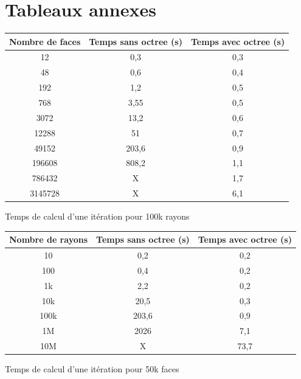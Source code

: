 \section{Tableaux annexes}

\begin{tableth}
	\begin{tabular}{| c | c | c |}
		\hline
		Nombre de faces & Temps \textbf{sans} \gls{octree} (s) & Temps \textbf{avec} \gls{octree} (s)\\
		  \hline
		  \hline
		   12 &0,3&	0,3 \\
		   \hline
		48 &0,6	&0,4 \\
		   \hline
		192 & 1,2	&0,5\\
		   \hline
		768 & 3,55&	0,5\\
		   \hline
		3072 & 13,2	&0,6\\
		   \hline
		12288 &51	&0,7 \\
		     \hline
		     49152 & 203,6	&0,9\\
		   \hline
		196608 & 808,2	&1,1\\
		\hline
		786432 & X & 1,7 \\
		\hline
		3145728 & X & 6,1 \\
		\hline
	 \end{tabular}
	\caption{Temps de calcul d'une itération pour 100k rayons}
	\label{tabComplexite1}
\end{tableth}

\begin{tableth}
	\begin{tabular}{| c | c | c |}
		\hline
		Nombre de rayons & Temps \textbf{sans} \gls{octree} (s)& Temps \textbf{avec} \gls{octree} (s)\\
		  \hline
		  \hline
		   10 &0,2&	0,2 \\
		   \hline
		100 &0,4	&0,2 \\
		   \hline
		1k & 2,2	&0,2\\
		   \hline
		10k & 20,5&	0,3\\
		   \hline
		100k & 203,6&	0,9\\
		   \hline
		1M &2026 &	7,1 \\
		\hline
		10M & X &	73,7 \\
		\hline
	 \end{tabular}
	\caption{Temps de calcul d'une itération pour 50k faces}
	\label{tabComplexite2}
\end{tableth}


 
 